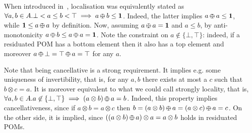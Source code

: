 \documentclass{llncs}
\def\1{{\mathbf 1}}
\def\1{{\mathbf 1}}
\def\odiv{\, {\ominus\hspace{-7.7pt} \div} \,}
\begin{document}
\begin{remark}
When introduced in~\cite[Def.~2.4]{ipl17}, localisation was equivalently stated as 
$\forall a, b \in A. \bot < a \leq b<\top \implies a \odiv b \leq \1$.
Indeed, the latter implies $a \odiv a \leq \1$, while  $\1 \leq a \odiv a$
by definition. Now, assuming $a \odiv a = \1$ and $a \leq b$, 
by anti-monotonicity $a \odiv b \leq a \odiv a = \1$.
Note the constraint on $a \not \in \{\bot,\top\}$: indeed, if a residuated POM 
has a bottom element then it also has a top element and moreover 
$a \odiv \bot = \top \odiv a = \top$ for any  $a$.

Note that being cancellative is a strong requirement. It implies e.g. 
some uniqueness of invertibility, that is, for any $a, b$ there exists 
at most a $c$ such that $b\otimes c = a$.
It is moreover equivalent to what we could call strongly locality,
that is, $\forall a, b \in A. a \not \in \{\bot,\top\} \implies (a \otimes b) \odiv a = b$. 
Indeed, this property implies cancellativeness, since if $a \otimes b = a \otimes c$ 
then $b = (a \otimes b) \odiv a = (a \otimes c) \odiv a = c$. On the other side,
it is implied, since 
$((a \otimes b) \odiv a)\otimes a = a \otimes b$ holds in residuated POMs.
\end{remark}
\end{document}
